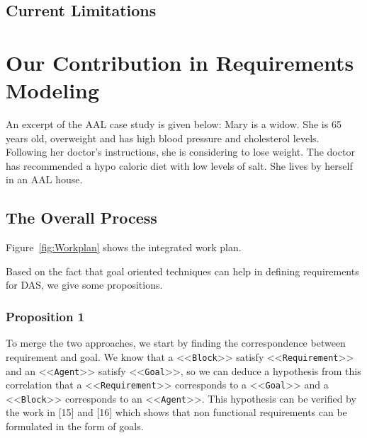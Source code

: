 \documentclass[10pt, conference, compsocconf]{IEEEtran}
\newcommand{\Myfig}[1]{Figure~\ref{fig:#1}}
\newcommand{\stereotype}[1]{\textless\textless\texttt{#1}\textgreater\textgreater}
\begin{document}
\subsection{Current Limitations}





\section{Our Contribution in Requirements Modeling}\label{sec:contrib}

An excerpt of the AAL case study is given below: 
Mary is a widow. She is 65 years old, overweight and has high blood pressure and cholesterol levels. Following her doctor's instructions, she is considering to lose weight. The doctor has recommended a hypo caloric diet with low levels of salt. She lives by herself in an AAL house.

\subsection{The Overall Process}

\Myfig{Workplan} shows the integrated work plan.


Based on the fact that goal oriented techniques can help in defining requirements for DAS, we give some propositions.

\subsubsection{Proposition 1}

To merge the two approaches, we start by finding the correspondence between requirement and goal. We know that a \stereotype{Block} satisfy \stereotype{Requirement} and an \stereotype{Agent} satisfy \stereotype{Goal}, so we can deduce a hypothesis from this correlation that a \stereotype{Requirement} corresponds to a \stereotype{Goal} and a \stereotype{Block} corresponds to an \stereotype{Agent}. This hypothesis can be verified by the work in [15] and [16] which shows that non functional requirements can be formulated in the form of goals. 
\end{document}
